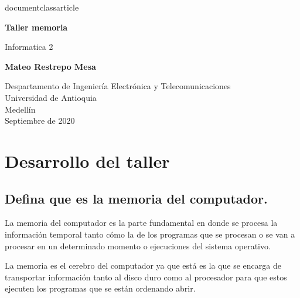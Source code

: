 documentclass{article}
\usepackage[utf8]{inputenc}
\usepackage[spanish]{babel}
\usepackage{listings}
\usepackage{graphicx}
\graphicspath{ {images/} }
\usepackage{cite}



\begin{titlepage}
    \begin{center}
        \vspace*{1cm}
            
        \Huge
        \textbf{Taller memoria}
            
        \vspace{0.5cm}
        \LARGE
        Informatica 2
            
        \vspace{1.5cm}
            
        \textbf{ Mateo Restrepo Mesa }
            
        \vfill
            
        \vspace{0.8cm}
            
        \Large
        Despartamento de Ingeniería Electrónica y Telecomunicaciones\\
        Universidad de Antioquia\\
        Medellín\\
        Septiembre de 2020
            
    \end{center}
\end{titlepage}



\section{Desarrollo del taller} \label{contenido}

\subsection{Defina que es la memoria del computador.}
La memoria del computador es la parte fundamental en donde se procesa la información temporal tanto cómo la de los programas que se procesan o se van a procesar en un determinado momento o ejecuciones del sistema operativo.

La memoria es el cerebro del computador ya que está es la que se encarga de transportar información tanto al disco duro como al procesador para que estos ejecuten los programas que se están ordenando abrir.

